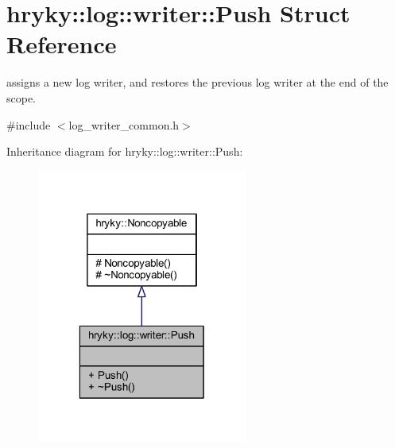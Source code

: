 \hypertarget{structhryky_1_1log_1_1writer_1_1_push}{\section{hryky\-:\-:log\-:\-:writer\-:\-:Push Struct Reference}
\label{structhryky_1_1log_1_1writer_1_1_push}
}


assigns a new log writer, and restores the previous log writer at the end of the scope.  




{\ttfamily \#include $<$log\-\_\-writer\-\_\-common.\-h$>$}



Inheritance diagram for hryky\-:\-:log\-:\-:writer\-:\-:Push\-:\nopagebreak
\begin{figure}[H]
\begin{center}
\leavevmode
\includegraphics[width=196pt]{structhryky_1_1log_1_1writer_1_1_push__inherit__graph}
\end{center}
\end{figure}
